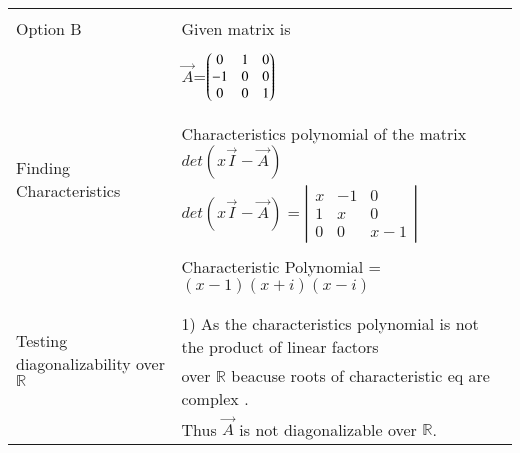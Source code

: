 \documentclass[journal,12pt]{IEEEtran}
\begin{document}
\begin{longtable}{|l|l|}
\hline \hline
\multirow{3}{*}{Option B} & \\
& Given matrix is  \\
&\\
& $\vec{A}$=$\begin{pmatrix}0&1&0\\-1&0&0\\0&0&1\end{pmatrix}$\\
&\\
\hline
\multirow{3}{*}{Finding Characteristics} & \\
&
Characteristics polynomial of the matrix $det(x\vec{I}-\vec{A})$\\ 
polynomial
& $det(x\vec{I}-\vec{A})= \left|
                \begin{array}{ccc}
                x & -1 & 0\\
                1 & x & 0\\
                0 & 0 & x-1
                \end{array} \right|$  \\
&\\
& Characteristic Polynomial = $(x-1)(x+i)(x-i)$\\
&\\
\hline
\multirow{3}{*}{Testing diagonalizability over $\mathbb{R}$} & \\
& 1) As the characteristics  polynomial is not the product of linear factors\\
&over $\mathbb{R}$ beacuse roots of characteristic eq are complex .\\ & Thus $\vec{A}$ is not diagonalizable over $\mathbb{R}$.\\


\end{longtable}
\end{document}
